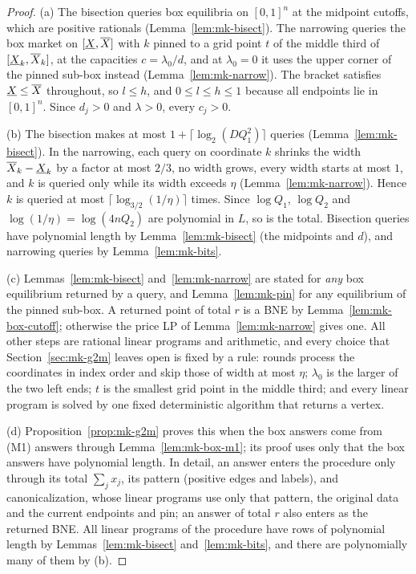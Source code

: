 \begin{proof}
(a) The bisection queries box equilibria on $[0,1]^n$ at the midpoint cutoffs, which are positive
rationals (Lemma~\ref{lem:mk-bisect}). The narrowing queries the box market on $[\underline{X},\overline{X}]$ with $k$
pinned to a grid point $t$ of the middle third of $[\underline{X}_k,\overline{X}_k]$, at the capacities
$c=\lambda_0/d$, and at $\lambda_0=0$ it uses the upper corner of the pinned sub-box instead
(Lemma~\ref{lem:mk-narrow}). The bracket satisfies $\underline{X}\le\overline{X}$ throughout, so $l\le h$, and
$0\le l\le h\le1$ because all endpoints lie in $[0,1]^n$. Since $d_j>0$ and $\lambda>0$, every $c_j>0$.

(b) The bisection makes at most $1+\lceil\log_2(DQ_1^2)\rceil$ queries (Lemma~\ref{lem:mk-bisect}). In
the narrowing, each query on coordinate $k$ shrinks the width $\overline{X}_k-\underline{X}_k$ by a factor at most $2/3$, no
width grows, every width starts at most $1$, and $k$ is queried only while its width exceeds $\eta$
(Lemma~\ref{lem:mk-narrow}). Hence $k$ is queried at most $\lceil\log_{3/2}(1/\eta)\rceil$ times. Since
$\log Q_1$, $\log Q_2$ and $\log(1/\eta)=\log(4nQ_2)$ are polynomial in $L$, so is the total. Bisection
queries have polynomial length by Lemma~\ref{lem:mk-bisect} (the midpoints and $d$), and narrowing
queries by Lemma~\ref{lem:mk-bits}.

(c) Lemmas~\ref{lem:mk-bisect} and~\ref{lem:mk-narrow} are stated for \emph{any} box equilibrium
returned by a query, and Lemma~\ref{lem:mk-pin} for any equilibrium of the pinned sub-box. A returned
point of total $r$ is a BNE by Lemma~\ref{lem:mk-box-cutoff}; otherwise the price LP of
Lemma~\ref{lem:mk-narrow} gives one. All other steps are rational linear programs and arithmetic, and
every choice that Section~\ref{sec:mk-g2m} leaves open is fixed by a rule: rounds process the
coordinates in index order and skip those of width at most $\eta$; $\lambda_0$ is the larger of the two
left ends; $t$ is the smallest grid point in the middle third; and every linear program is solved by one
fixed deterministic algorithm that returns a vertex.

(d) Proposition~\ref{prop:mk-g2m} proves this when the box answers come from (M1) answers through
Lemma~\ref{lem:mk-box-m1}; its proof uses only that the box answers have polynomial length. In detail,
an answer enters the procedure only through its total $\sum_jx_j$, its pattern (positive edges and
labels), and canonicalization, whose linear programs use only that pattern, the original data and the
current endpoints and pin; an answer of total $r$ also enters as the returned BNE. All linear programs of the procedure have rows of polynomial length by
Lemmas~\ref{lem:mk-bisect} and~\ref{lem:mk-bits}, and there are polynomially many of them by (b).
\end{proof}


